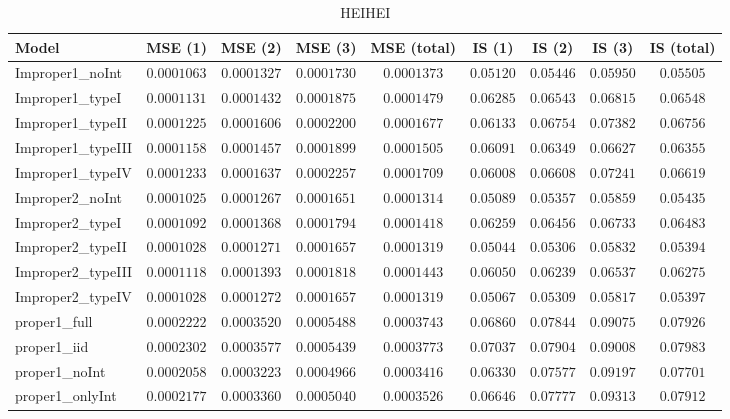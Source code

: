 \begin{table}

\caption{\label{tab:model-choice-sc5}HEIHEI}
\centering
\begin{tabular}{lcccccccc}
\hline
Model  & MSE (1) & MSE (2) & MSE (3) & MSE (total) & IS (1) & IS (2) & IS (3) & \multicolumn{1}{c}{IS (total)} \\ 
\hline
Improper1_noInt  & $0.0001063$ & $0.0001327$ & $0.0001730$ & $0.0001373$ & $0.05120$ & $0.05446$ & $0.05950$ & $0.05505$ \\
Improper1_typeI  & $0.0001131$ & $0.0001432$ & $0.0001875$ & $0.0001479$ & $0.06285$ & $0.06543$ & $0.06815$ & $0.06548$ \\
Improper1_typeII  & $0.0001225$ & $0.0001606$ & $0.0002200$ & $0.0001677$ & $0.06133$ & $0.06754$ & $0.07382$ & $0.06756$ \\
Improper1_typeIII  & $0.0001158$ & $0.0001457$ & $0.0001899$ & $0.0001505$ & $0.06091$ & $0.06349$ & $0.06627$ & $0.06355$ \\
Improper1_typeIV  & $0.0001233$ & $0.0001637$ & $0.0002257$ & $0.0001709$ & $0.06008$ & $0.06608$ & $0.07241$ & $0.06619$ \\
Improper2_noInt  & $0.0001025$ & $0.0001267$ & $0.0001651$ & $0.0001314$ & $0.05089$ & $0.05357$ & $0.05859$ & $0.05435$ \\
Improper2_typeI  & $0.0001092$ & $0.0001368$ & $0.0001794$ & $0.0001418$ & $0.06259$ & $0.06456$ & $0.06733$ & $0.06483$ \\
Improper2_typeII  & $0.0001028$ & $0.0001271$ & $0.0001657$ & $0.0001319$ & $0.05044$ & $0.05306$ & $0.05832$ & $0.05394$ \\
Improper2_typeIII  & $0.0001118$ & $0.0001393$ & $0.0001818$ & $0.0001443$ & $0.06050$ & $0.06239$ & $0.06537$ & $0.06275$ \\
Improper2_typeIV  & $0.0001028$ & $0.0001272$ & $0.0001657$ & $0.0001319$ & $0.05067$ & $0.05309$ & $0.05817$ & $0.05397$ \\
proper1_full  & $0.0002222$ & $0.0003520$ & $0.0005488$ & $0.0003743$ & $0.06860$ & $0.07844$ & $0.09075$ & $0.07926$ \\
proper1_iid  & $0.0002302$ & $0.0003577$ & $0.0005439$ & $0.0003773$ & $0.07037$ & $0.07904$ & $0.09008$ & $0.07983$ \\
proper1_noInt  & $0.0002058$ & $0.0003223$ & $0.0004966$ & $0.0003416$ & $0.06330$ & $0.07577$ & $0.09197$ & $0.07701$ \\
proper1_onlyInt  & $0.0002177$ & $0.0003360$ & $0.0005040$ & $0.0003526$ & $0.06646$ & $0.07777$ & $0.09313$ & $0.07912$ \\

\end{tabular}
\end{table}
